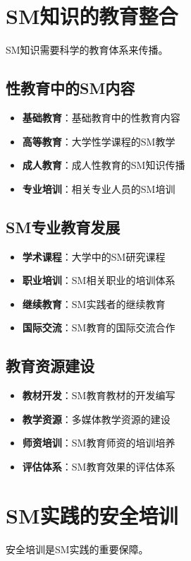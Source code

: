 \documentclass[12pt,UTF8]{ctexbook}
\begin{document}
\section{SM知识的教育整合}
SM知识需要科学的教育体系来传播。

\subsection{性教育中的SM内容}
\begin{itemize}[leftmargin=2cm]
	\item \textbf{基础教育}：基础教育中的性教育内容
	\item \textbf{高等教育}：大学性学课程的SM教学
	\item \textbf{成人教育}：成人性教育的SM知识传播
	\item \textbf{专业培训}：相关专业人员的SM培训
\end{itemize}

\subsection{SM专业教育发展}
\begin{itemize}[leftmargin=2cm]
	\item \textbf{学术课程}：大学中的SM研究课程
	\item \textbf{职业培训}：SM相关职业的培训体系
	\item \textbf{继续教育}：SM实践者的继续教育
	\item \textbf{国际交流}：SM教育的国际交流合作
\end{itemize}

\subsection{教育资源建设}
\begin{itemize}[leftmargin=2cm]
	\item \textbf{教材开发}：SM教育教材的开发编写
	\item \textbf{教学资源}：多媒体教学资源的建设
	\item \textbf{师资培训}：SM教育师资的培训培养
	\item \textbf{评估体系}：SM教育效果的评估体系
\end{itemize}

\section{SM实践的安全培训}
安全培训是SM实践的重要保障。
\end{document}
